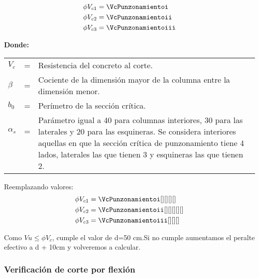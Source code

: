 \documentclass{article}%
\begin{document}
\begin{align}
	\phi V_{c1} &= \VcPunzonamientoi \\
	\phi V_{c2} &= \VcPunzonamientoii \\
	\phi V_{c3} &= \VcPunzonamientoiii
\end{align}

\textbf{Donde:}

\begin{table}[h!]
    \centering
    \begin{tabular}{lll}
        $V_c$       &=& Resistencia del concreto al corte.\\
        $\beta$   &=& Cociente de la dimensión mayor de la columna entre la dimensión menor.\\
        $b_0$       &=& Perímetro de la sección crítica.\\
        $\alpha_s$  &=& \multirow{4}{14.6cm}{Parámetro igual a 40 para columnas interiores, 30 para las laterales y 20 para las esquineras. Se considera interiores aquellas en que la sección crítica de punzonamiento tiene 4 lados, laterales las que tienen 3 y esquineras las que tienen 2.}\\
                    & & \\
                    & & \\
                    & & \\
    \end{tabular}
\end{table}
Reemplazando valores:
\begin{align*}
	\phi V_{c1} &= \VcPunzonamientoi[][][][] \\
	\phi V_{c2} &= \VcPunzonamientoii[][][][][]\\
	\phi V_{c3} &= \VcPunzonamientoiii[][][]
\end{align*}

Como $Vu \leq  \phi V_c  $, cumple el valor de d=50 cm.Si no cumple aumentamos el peralte efectivo a
d + 10cm y volveremos a calcular.

\subsubsection{Verificación de corte por flexión}
\end{document}
